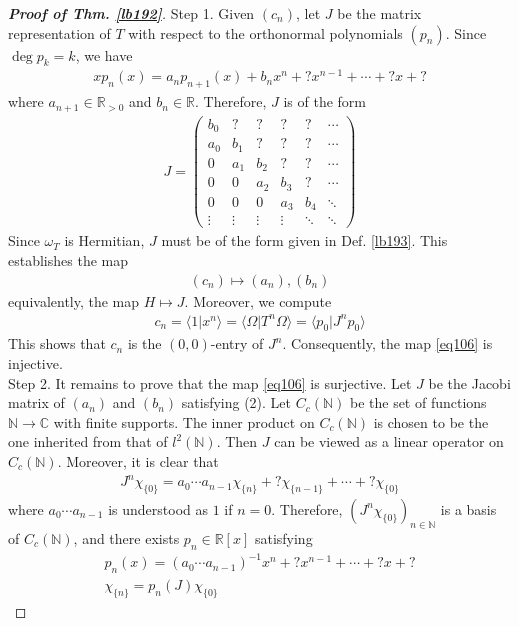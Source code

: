 \documentclass[12pt,b5paper,notitlepage]{article}
\theoremstyle{definition}
\theoremstyle{plain}
\newcommand{\bk}[1]{\langle {#1}\rangle}
\newcommand{\Cbb}{\mathbb C}
\newcommand{\Nbb}{\mathbb N}
\newcommand{\Rbb}{\mathbb R}
\numberwithin{equation}{section}
\begin{document}
\begin{proof}[\textbf{Proof of Thm. \ref{lb192}}]
Step 1. Given $(c_n)$, let $J$ be the matrix representation of $T$ with respect to the orthonormal polynomials $(p_n)$. Since $\deg p_k=k$, we have
\begin{align}
xp_n(x)=a_np_{n+1}(x)+ b_n x^n+? x^{n-1}+\cdots+? x+?
\end{align}
where $a_{n+1}\in\Rbb_{>0}$ and $b_n\in\Rbb$. Therefore, $J$ is of the form
\begin{align*}
J=\begin{pmatrix}
b_0&?&?&?&?&\cdots\\
a_0&b_1&?&?&?&\cdots\\
0&a_1&b_2&?&?&\cdots\\
0&0&a_2&b_3&?&\cdots\\
0&0&0&a_3&b_4&\ddots\\
\vdots&\vdots&\vdots&\vdots&\ddots&\ddots
\end{pmatrix}
\end{align*}
Since $\omega_T$ is Hermitian, $J$ must be of the form given in Def. \ref{lb193}. This establishes the map
\begin{align}\label{eq106}
(c_n)\mapsto (a_n),(b_n)
\end{align}
equivalently, the map $H\mapsto J$. Moreover, we compute
\begin{align*}
c_n=\bk{1|x^n}=\bk{\Omega|T^n\Omega}=\bk{p_0|J^n p_0}
\end{align*}
This shows that $c_n$ is the $(0,0)$-entry of $J^n$. Consequently, the map \eqref{eq106} is injective.\\[-1ex]

Step 2. It remains to prove that the map \eqref{eq106} is surjective. Let $J$ be the Jacobi matrix of $(a_n)$ and $(b_n)$ satisfying (2). Let $C_c(\Nbb)$ be the set of functions $\Nbb\rightarrow\Cbb$ with finite supports. The inner product on $C_c(\Nbb)$ is chosen to be the one inherited from that of $l^2(\Nbb)$. Then $J$ can be viewed as a linear operator on $C_c(\Nbb)$. Moreover, it is clear that
\begin{align*}
J^n\chi_{\{0\}}=a_0\cdots a_{n-1} \chi_{\{n\}}+?\chi_{\{n-1\}}+\cdots+?\chi_{\{0\}}
\end{align*}
where $a_0\cdots a_{n-1}$ is understood as $1$ if $n=0$. Therefore, $(J^n\chi_{\{0\}})_{n\in\Nbb}$ is a basis of $C_c(\Nbb)$, and there exists $p_n\in\Rbb[x]$ satisfying
\begin{subequations}\label{eq108}
\begin{gather}
p_n(x)=(a_0\cdots a_{n-1})^{-1}x^n+?x^{n-1}+\cdots+?x+?\label{eq108a}\\
\chi_{\{n\}}=p_n(J)\chi_{\{0\}}\label{eq108b}
\end{gather}
\end{subequations}



\end{proof}
\end{document}
